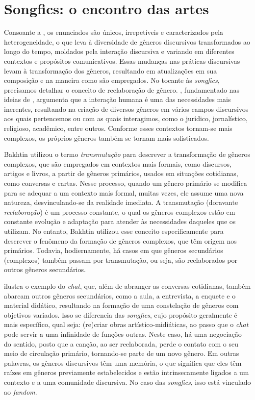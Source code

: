 
\section{Songfics: o encontro das artes}\label{sec-songfics}

Consoante a \textcite{bakhtin2011}, os enunciados são únicos, irrepetíveis e
caracterizados pela heterogeneidade, o que leva à diversidade de gêneros
discursivos transformados ao longo do tempo, moldados pela interação
discursiva e variando em diferentes contextos e propósitos
comunicativos. Essas mudanças nas práticas discursivas levam à
transformação dos gêneros, resultando em atualizações em sua composição
e na maneira como são empregados. No tocante às \emph{songfics},
precisamos detalhar o conceito de reelaboração de gênero. \textcite{araujo2009},
fundamentado nas ideias de \textcite{bakhtin_os_1997}, argumenta que a
interação humana é uma das necessidades mais inerentes, resultando na
criação de diversos gêneros em vários campos discursivos aos quais
pertencemos ou com as quais interagimos, como o jurídico, jornalístico,
religioso, acadêmico, entre outros. Conforme esses contextos tornam-se
mais complexos, os próprios gêneros também se tornam mais sofisticados.

Bakhtin utilizou o termo \emph{transmutação} para descrever a
transformação de gêneros complexos, que são empregados em contextos mais
formais, como discursos, artigos e livros, a partir de gêneros
primários, usados em situações cotidianas, como conversas e cartas.
Nesse processo, quando um gênero primário se modifica para se adequar a
um contexto mais formal, muitas vezes, ele assume uma nova natureza,
desvinculando-se da realidade imediata. A transmutação (doravante
\emph{reelaboração}) é um processo constante, o qual os gêneros
complexos estão em constante evolução e adaptação para atender às
necessidades daqueles que os utilizam. No entanto, Bakhtin utilizou esse
conceito especificamente para descrever o fenômeno da formação de
gêneros complexos, que têm origem nos primários. Todavia, hodiernamente,
há casos em que gêneros secundários (complexos) também passam por
transmutação, ou seja, são reelaborados por outros gêneros secundários.

\textcite{araujo2009} ilustra o exemplo do \emph{chat}, que, além de abranger as
conversas cotidianas, também abarcam outros gêneros secundários, como a
aula, a entrevista, a enquete e o material didático, resultando na
formação de uma constelação de gêneros com objetivos variados. Isso se
diferencia das \emph{songfics}, cujo propósito geralmente é mais
específico, qual seja: (re)criar obras artístico-midiáticas, ao passo
que o \emph{chat} pode servir a uma infinidade de funções outras. Neste
caso, há uma negociação do sentido, posto que a canção, ao ser
reelaborada, perde o contato com o seu meio de circulação primário,
tornando-se parte de um novo gênero. Em outras palavras, os gêneros
discursivos têm uma memória, o que significa que eles têm raízes em
gêneros previamente estabelecidos e estão intrinsecamente ligados a um
contexto e a uma comunidade discursiva. No caso das \emph{songfics},
isso está vinculado ao \emph{fandom}.

